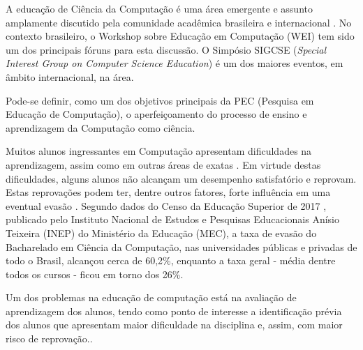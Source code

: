 \documentclass[
	12pt,				%
	openright,			%
	oneside,
	a4paper,			%
	english,			%
	french,				%
	spanish,			%
	brazil,				%
	]{abntex2}
\begin{document}




A educação de Ciência da Computação é uma área emergente e assunto amplamente discutido pela comunidade acadêmica brasileira e internacional \cite{fincher2005mapping}. No contexto brasileiro, o Workshop sobre Educação em Computação (WEI) tem sido um dos principais fóruns para esta discussão. O Simpósio SIGCSE (\textit{Special Interest Group on Computer Science Education}) é um dos maiores eventos, em âmbito internacional, na área. 

Pode-se definir, como um dos objetivos principais da PEC (Pesquisa em Educação de Computação), o aperfeiçoamento do processo de ensino e aprendizagem da Computação como ciência. \cite{holmboe2001research}

Muitos alunos ingressantes em Computação apresentam dificuldades na aprendizagem, assim como em outras áreas de exatas \cite{blando2015dificuldades}. Em virtude destas dificuldades, alguns alunos não alcançam um desempenho satisfatório e reprovam. Estas reprovações podem ter, dentre outros fatores, forte influência em uma eventual evasão \cite{evasaoMatheus2014}. Segundo dados do Censo da Educação Superior de 2017 \cite{Inep2017}, publicado pelo Instituto Nacional de Estudos e Pesquisas Educacionais Anísio Teixeira (INEP) do Ministério da Educação (MEC), a taxa de evasão do Bacharelado em Ciência da Computação, nas universidades públicas e privadas de todo o Brasil, alcançou cerca de 60,2\%, enquanto a taxa geral - média dentre todos os cursos - ficou em torno dos 26\%.

Um dos problemas na educação de computação está na avaliação de aprendizagem dos alunos, tendo como ponto de interesse
a identificação prévia dos alunos que apresentam maior dificuldade na disciplina e, assim, com maior risco de reprovação.\cite{martins2012assistente}. %
\end{document}
